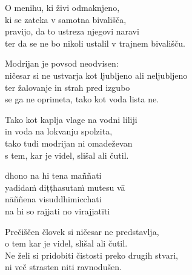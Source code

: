 O menihu, ki živi odmaknjeno,\\
ki se zateka v samotna bivališča,\\
pravijo, da to ustreza njegovi naravi\\
ter da se ne bo nikoli ustalil v trajnem bivališču.

Modrijan je povsod neodvisen:\\
ničesar si ne ustvarja kot ljubljeno ali neljubljeno\\
ter žalovanje in strah pred izgubo\\
se ga ne oprimeta, tako kot voda lista ne.

Tako kot kaplja vlage na vodni liliji\\
in voda na lokvanju spolzita,\\
tako tudi modrijan ni omadeževan\\
s tem, kar je videl, slišal ali čutil.


\clearpage

dhono na hi tena maññati\\
yadidaṁ diṭṭhasutaṁ mutesu vā\\
nāññena visuddhimicchati\\
na hi so rajjati no virajjatīti


\clearpage

Prečiščen človek si ničesar ne predstavlja,\\
o tem kar je videl, slišal ali čutil.\\
Ne želi si pridobiti čistosti preko drugih stvari,\\
ni več strasten niti ravnodušen.

